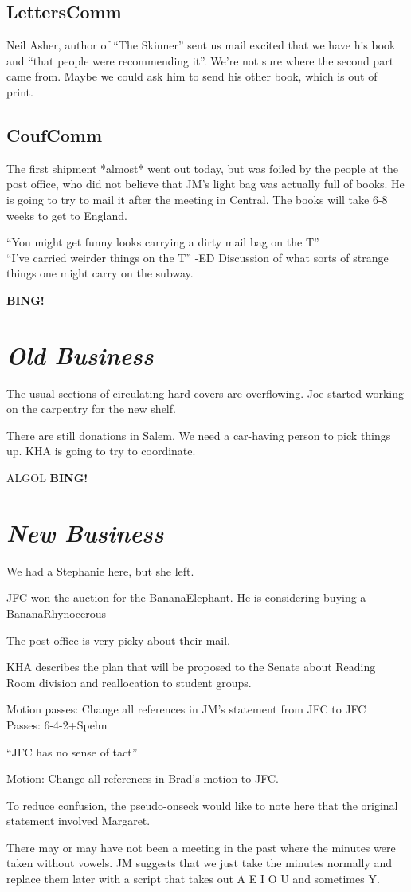 \documentclass[10pt]{article}
\newcommand{\bing}{{\bf BING!} }
\newcommand{\goto}[1]{\bing \vskip 12pt \section*{{\em{#1}}}}
\begin{document}
\subsection*{LettersComm}
Neil Asher, author of  ``The Skinner'' sent us mail excited that we
have his book and ``that people were recommending it''. We're not sure
where the second part came from.
Maybe we could ask him to send his other book, which is out of print.

\subsection*{CoufComm}
The first shipment *almost* went out today, but was foiled by the
people at the post office, who did not believe that JM's light
bag was actually full of books. He is going to try to mail it after
the meeting in Central. The books will take 6-8 weeks to get to England.

``You might get funny looks carrying a dirty mail bag on the T'' \\
``I've carried weirder things on the T'' -ED
Discussion of what sorts of strange things one might carry on the
subway.

\goto{Old Business}
The usual sections of circulating hard-covers are overflowing. Joe
started working on the carpentry for the new shelf.

There are still donations in Salem. We need a car-having person to
pick things up. KHA is going to try to coordinate.

ALGOL
\goto{New Business}
We had a Stephanie here, but she left.

JFC won the auction for the BananaElephant. He is considering buying a BananaRhynocerous

The post office is very picky about their mail.

KHA describes the plan that will be proposed to the Senate about
Reading Room division and reallocation to student groups.


Motion passes: Change all references in JM's statement from JFC to JFC \\
Passes: 6-4-2+Spehn

``JFC has no sense of tact''

Motion: Change all references in Brad's motion to JFC.

To reduce confusion, the pseudo-onseck would like to note here
that the original statement involved Margaret.

There may or may have not been a meeting in the past where the minutes
were taken without vowels. JM suggests that we just take the minutes
normally and replace them later with a script that takes out A E I O U
and sometimes Y.
\end{document}
